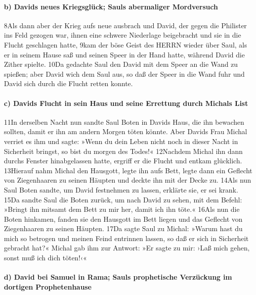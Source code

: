 \hypertarget{b-davids-neues-kriegsgluxfcck-sauls-abermaliger-mordversuch}{%
\paragraph{b) Davids neues Kriegsglück; Sauls abermaliger
Mordversuch}\label{b-davids-neues-kriegsgluxfcck-sauls-abermaliger-mordversuch}}

8Als dann aber der Krieg aufs neue ausbrach und David, der gegen die
Philister ins Feld gezogen war, ihnen eine schwere Niederlage
beigebracht und sie in die Flucht geschlagen hatte, 9kam der böse Geist
des HERRN wieder über Saul, als er in seinem Hause saß und seinen Speer
in der Hand hatte, während David die Zither spielte. 10Da gedachte Saul
den David mit dem Speer an die Wand zu spießen; aber David wich dem Saul
aus, so daß der Speer in die Wand fuhr und David sich durch die Flucht
retten konnte.

\hypertarget{c-davids-flucht-in-sein-haus-und-seine-errettung-durch-michals-list}{%
\paragraph{c) Davids Flucht in sein Haus und seine Errettung durch
Michals
List}\label{c-davids-flucht-in-sein-haus-und-seine-errettung-durch-michals-list}}

11In derselben Nacht nun sandte Saul Boten in Davids Haus, die ihn
bewachen sollten, damit er ihn am andern Morgen töten könnte. Aber
Davids Frau Michal verriet es ihm und sagte: »Wenn du dein Leben nicht
noch in dieser Nacht in Sicherheit bringst, so bist du morgen des
Todes!« 12Nachdem Michal ihn dann durchs Fenster hinabgelassen hatte,
ergriff er die Flucht und entkam glücklich. 13Hierauf nahm Michal den
Hausgott, legte ihn aufs Bett, legte dann ein Geflecht von Ziegenhaaren
zu seinen Häupten und deckte ihn mit der Decke zu. 14Als nun Saul Boten
sandte, um David festnehmen zu lassen, erklärte sie, er sei krank. 15Da
sandte Saul die Boten zurück, um nach David zu sehen, mit dem Befehl:
»Bringt ihn mitsamt dem Bett zu mir her, damit ich ihn töte.« 16Als nun
die Boten hinkamen, fanden sie den Hausgott im Bett liegen und das
Geflecht von Ziegenhaaren zu seinen Häupten. 17Da sagte Saul zu Michal:
»Warum hast du mich so betrogen und meinen Feind entrinnen lassen, so
daß er sich in Sicherheit gebracht hat?« Michal gab ihm zur Antwort: »Er
sagte zu mir: ›Laß mich gehen, sonst muß ich dich töten!‹«

\hypertarget{d-david-bei-samuel-in-rama-sauls-prophetische-verzuxfcckung-im-dortigen-prophetenhause}{%
\paragraph{d) David bei Samuel in Rama; Sauls prophetische Verzückung im
dortigen
Prophetenhause}\label{d-david-bei-samuel-in-rama-sauls-prophetische-verzuxfcckung-im-dortigen-prophetenhause}}

